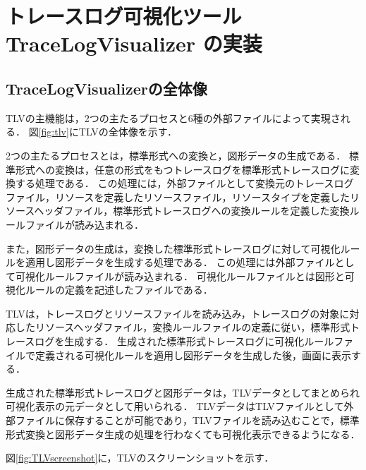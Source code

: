 \chapter{トレースログ可視化ツール TraceLogVisualizer の実装}

\section{TraceLogVisualizerの全体像}

TLVの主機能は，2つの主たるプロセスと6種の外部ファイルによって実現される．
図\ref{fig:tlv}にTLVの全体像を示す．

2つの主たるプロセスとは，標準形式への変換と，図形データの生成である．
標準形式への変換は，任意の形式をもつトレースログを標準形式トレースログに変換する処理である．
この処理には，外部ファイルとして変換元のトレースログファイル，リソースを定義したリソースファイル，リソースタイプを定義したリソースヘッダファイル，標準形式トレースログへの変換ルールを定義した変換ルールファイルが読み込まれる．

また，図形データの生成は，変換した標準形式トレースログに対して可視化ルールを適用し図形データを生成する処理である．
この処理には外部ファイルとして可視化ルールファイルが読み込まれる．
可視化ルールファイルとは図形と可視化ルールの定義を記述したファイルである．

TLVは，トレースログとリソースファイルを読み込み，トレースログの対象に対応したリソースヘッダファイル，変換ルールファイルの定義に従い，標準形式トレースログを生成する．
生成された標準形式トレースログに可視化ルールファイルで定義される可視化ルールを適用し図形データを生成した後，画面に表示する．

生成された標準形式トレースログと図形データは，TLVデータとしてまとめられ可視化表示の元データとして用いられる．
TLVデータはTLVファイルとして外部ファイルに保存することが可能であり，TLVファイルを読み込むことで，標準形式変換と図形データ生成の処理を行わなくても可視化表示できるようになる．

図\ref{fig:TLVscreenshot}に，TLVのスクリーンショットを示す．

